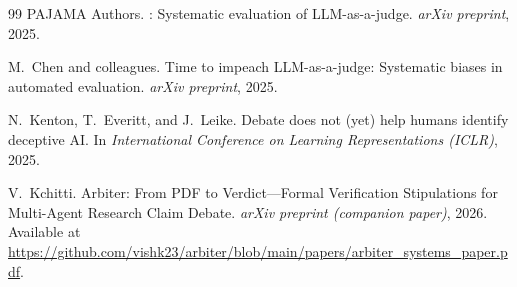 \documentclass[11pt]{article}
\begin{document}
\begin{thebibliography}{99}
PAJAMA Authors.
: Systematic evaluation of {LLM}-as-a-judge.
\newblock \emph{arXiv preprint}, 2025.

M.~Chen and colleagues.
\newblock Time to impeach {LLM}-as-a-judge: Systematic biases in automated evaluation.
\newblock \emph{arXiv preprint}, 2025.

N.~Kenton, T.~Everitt, and J.~Leike.
\newblock Debate does not (yet) help humans identify deceptive {AI}.
\newblock In \emph{International Conference on Learning Representations (ICLR)}, 2025.

V.~Kchitti.
\newblock Arbiter: From {PDF} to Verdict---Formal Verification Stipulations for Multi-Agent Research Claim Debate.
\newblock \emph{arXiv preprint (companion paper)}, 2026.
\newblock Available at \url{https://github.com/vishk23/arbiter/blob/main/papers/arbiter_systems_paper.pdf}.

\end{thebibliography}
\end{document}
